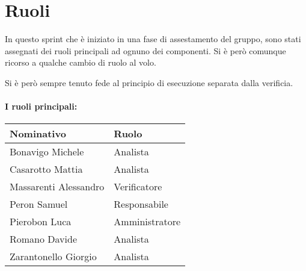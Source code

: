 \section{Ruoli}

In questo sprint che è iniziato in una fase di assestamento del gruppo, sono stati assegnati dei ruoli principali ad ognuno dei componenti. Si è però comunque ricorso a qualche cambio di ruolo al volo. 

Si è però sempre tenuto fede al principio di esecuzione separata dalla verificia.

\paragraph{I ruoli principali:}

\begin{center}
    \begin{tabularx}{\textwidth}{X l}
        
        \rowcolor{gray!30} \textbf{Nominativo} & \textbf{Ruolo}\\
        
        \hline

        Bonavigo Michele & Analista \\
        \rowcolor{gray!10}Casarotto Mattia & Analista \\
        Massarenti Alessandro & Verificatore \\
        \rowcolor{gray!10}Peron Samuel & Responsabile \\
        Pierobon Luca & Amministratore \\
        \rowcolor{gray!10}Romano Davide & Analista \\
        Zarantonello Giorgio & Analista \\

    \end{tabularx}
\end{center}
